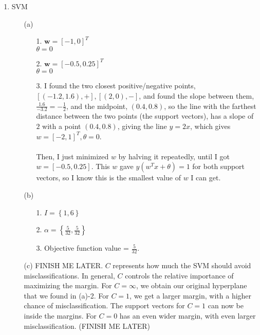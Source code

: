 
\usepackage{amssymb}
\oddsidemargin 0in
\evensidemargin 0in
\textwidth 6.5in
\topmargin -0.5in
\textheight 9.0in





\pagestyle{myheadings}  %

\begin{enumerate}
\item SVM
  \begin{enumerate}
  \item [(a)]
    \begin{enumerate}  
    \item [1.]
      $\textbf{w} = [-1,0]^T$\\
      $\theta = 0$
    \item [2.]
      $\textbf{w} = [-0.5,0.25]^T$\\
      $\theta = 0$
    \item [3.]
      I found the two closest positive/negative points, $[(-1.2,1.6), +], [(2,0), -]$, and found the slope between them, $\frac{1.6}{-3.2} = -\frac{1}{2}$, and the midpoint, $(0.4, 0.8)$, so the line with the farthest distance between the two points (the support vectors), has a slope of $2$ with a point $(0.4, 0.8)$, giving the line $y=2x$, which gives $w=[-2,1]^T, \theta=0$.\\\\
      Then, I just minimized $w$ by halving it repeatedly, until I got $w=[-0.5,0.25]$. This $w$ gave $y(w^Tx+\theta)=1$ for both support vectors, so I know this is the smallest value of $w$ I can get.      
    \end{enumerate}
  \item [(b)]
    \begin{enumerate}
    \item [1.]
      $I = \left\{1,6\right\}$
    \item [2.]
      $\alpha = \left\{\frac{5}{32},\frac{5}{32}\right\}$
    \item [3.]
      Objective function value = $\frac{5}{32}$.
    \end{enumerate}
  \item [(c)]
    FINISH ME LATER. $C$ represents how much the SVM should avoid misclassifications. In general, $C$ controls the relative importance of maximizing the margin. For $C=\infty$, we obtain our original hyperplane that we found in (a)-2. For $C=1$, we get a larger margin, with a higher chance of misclassification. The support vectors for $C=1$ can now be inside the margins. For $C=0$ has an even wider margin, with even larger misclassification. (FINISH ME LATER)

\end{enumerate}
\end{enumerate}
